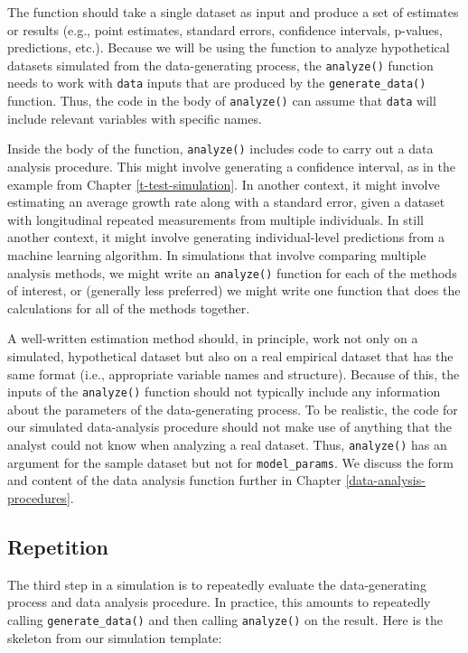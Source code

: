 \documentclass[
]{book}
\begin{document}
The function should take a single dataset as input and produce a set of estimates or results (e.g., point estimates, standard errors, confidence intervals, p-values, predictions, etc.).
Because we will be using the function to analyze hypothetical datasets simulated from the data-generating process, the \texttt{analyze()} function needs to work with \texttt{data} inputs that are produced by the \texttt{generate\_data()} function.
Thus, the code in the body of \texttt{analyze()} can assume that \texttt{data} will include relevant variables with specific names.

Inside the body of the function, \texttt{analyze()} includes code to carry out a data analysis procedure.
This might involve generating a confidence interval, as in the example from Chapter \ref{t-test-simulation}.
In another context, it might involve estimating an average growth rate along with a standard error, given a dataset with longitudinal repeated measurements from multiple individuals.
In still another context, it might involve generating individual-level predictions from a machine learning algorithm.
In simulations that involve comparing multiple analysis methods, we might write an \texttt{analyze()} function for each of the methods of interest, or (generally less preferred) we might write one function that does the calculations for all of the methods together.

A well-written estimation method should, in principle, work not only on a simulated, hypothetical dataset but also on a real empirical dataset that has the same format (i.e., appropriate variable names and structure).
Because of this, the inputs of the \texttt{analyze()} function should not typically include any information about the parameters of the data-generating process.
To be realistic, the code for our simulated data-analysis procedure should not make use of anything that the analyst could not know when analyzing a real dataset.
Thus, \texttt{analyze()} has an argument for the sample dataset but not for \texttt{model\_params}.
We discuss the form and content of the data analysis function further in Chapter \ref{data-analysis-procedures}.

\subsection{Repetition}\label{repetition}

The third step in a simulation is to repeatedly evaluate the data-generating process and data analysis procedure.
In practice, this amounts to repeatedly calling \texttt{generate\_data()} and then calling \texttt{analyze()} on the result.
Here is the skeleton from our simulation template:
\end{document}
